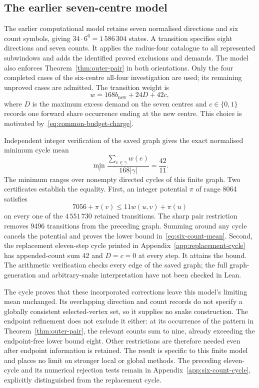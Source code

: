 \documentclass[11pt,a4paper]{article}
\theoremstyle{definition}
\theoremstyle{remark}
\begin{document}
\subsection{The earlier seven-centre model}
The earlier computational model retains seven normalised directions and six count symbols, giving $34\cdot6^6=1\,586\,304$ states. A transition specifies eight directions and seven counts. It applies the radius-four catalogue to all represented subwindows and adds the identified proved exclusions and demands. The model also enforces Theorem~\ref{thm:outer-pair} in both orientations. Only the four completed cases of the six-centre all-four investigation are used; its remaining unproved cases are admitted. The transition weight is
\[
w=168b_{\mathrm{new}}+24D+42c,
\]
where $D$ is the maximum excess demand on the seven centres and $c\in\{0,1\}$ records one forward share occurrence ending at the new centre. This choice is motivated by~\eqref{eq:common-budget-charge}.

Independent integer verification of the saved graph gives the exact normalised minimum cycle mean
\begin{equation}\label{eq:six-count-mean}
\min_{\gamma}\frac{\sum_{e\in\gamma}w(e)}{168|\gamma|}=\frac{42}{11}.
\end{equation}
The minimum ranges over nonempty directed cycles of this finite graph. Two certificates establish the equality. First, an integer potential $\pi$ of range 8064 satisfies
\[
7056+\pi(v)\le11w(u,v)+\pi(u)
\]
on every one of the $4\,551\,730$ retained transitions. The sharp pair restriction removes 9496 transitions from the preceding graph. Summing around any cycle cancels the potential and proves the lower bound in~\eqref{eq:six-count-mean}. Second, the replacement eleven-step cycle printed in Appendix~\ref{app:replacement-cycle} has appended-count sum 42 and $D=c=0$ at every step. It attains the bound. The arithmetic verification checks every edge of the saved graph; the full graph-generation and arbitrary-snake interpretation have not been checked in Lean.

The cycle proves that these incorporated corrections leave this model's limiting mean unchanged. Its overlapping direction and count records do not specify a globally consistent selected-vertex set, so it supplies no snake construction. The endpoint refinement does not exclude it either: at its occurrence of the pattern in Theorem~\ref{thm:outer-pair}, the relevant counts sum to nine, already exceeding the endpoint-free lower bound eight. Other restrictions are therefore needed even after endpoint information is retained. The result is specific to this finite model and places no limit on stronger local or global methods. The preceding eleven-cycle and its numerical rejection tests remain in Appendix~\ref{app:six-count-cycle}, explicitly distinguished from the replacement cycle.
\end{document}
